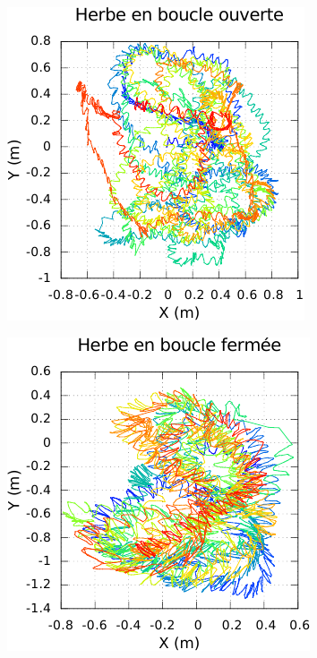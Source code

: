 \begin{figure}[htbp]
    \centerfloat
    \begin{subfigure}{0.22\paperwidth}
        \centering
        \includegraphics[type=pdf,ext=.pdf,read=.pdf,width=1.0\linewidth]{../plot/OdometryLWPR/grass_open_learn_log_complete_traj}
    \end{subfigure}
    \begin{subfigure}{0.22\paperwidth}
        \centering
        \includegraphics[type=pdf,ext=.pdf,read=.pdf,width=1.0\linewidth]{../plot/OdometryLWPR/grass_close_learn_log_complete_traj}

\end{subfigure}
\end{figure}
